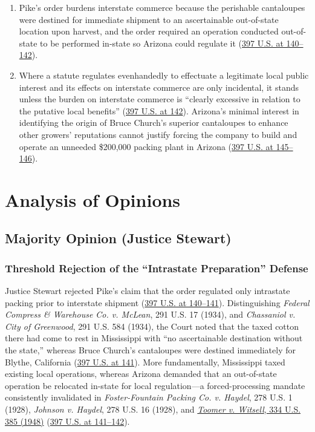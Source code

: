 \documentclass[12pt]{article}
\begin{document}
\begin{enumerate}
  \item Pike's order burdens interstate commerce because the perishable cantaloupes were destined for immediate shipment to an ascertainable out-of-state location upon harvest, and the order required an operation conducted out-of-state to be performed in-state so Arizona could regulate it (\href{https://supreme.justia.com/cases/federal/us/397/137/}{397 U.S. at 140--142}).
  \item Where a statute regulates evenhandedly to effectuate a legitimate local public interest and its effects on interstate commerce are only incidental, it stands unless the burden on interstate commerce is ``clearly excessive in relation to the putative local benefits'' (\href{https://supreme.justia.com/cases/federal/us/397/137/}{397 U.S. at 142}). Arizona's minimal interest in identifying the origin of Bruce Church's superior cantaloupes to enhance other growers' reputations cannot justify forcing the company to build and operate an unneeded \$200,000 packing plant in Arizona (\href{https://supreme.justia.com/cases/federal/us/397/137/}{397 U.S. at 145--146}).
\end{enumerate}

\section{Analysis of Opinions}
\subsection{Majority Opinion (Justice Stewart)}

\subsubsection{Threshold Rejection of the ``Intrastate Preparation'' Defense}

Justice Stewart rejected Pike's claim that the order regulated only intrastate packing prior to interstate shipment (\href{https://supreme.justia.com/cases/federal/us/397/137/}{397 U.S. at 140--141}). Distinguishing \textit{Federal Compress \& Warehouse Co. v. McLean}, 291 U.S. 17 (1934), and \textit{Chassaniol v. City of Greenwood}, 291 U.S. 584 (1934), the Court noted that the taxed cotton there had come to rest in Mississippi with ``no ascertainable destination without the state,'' whereas Bruce Church's cantaloupes were destined immediately for Blythe, California (\href{https://supreme.justia.com/cases/federal/us/397/137/}{397 U.S. at 141}). More fundamentally, Mississippi taxed existing local operations, whereas Arizona demanded that an out-of-state operation be relocated in-state for local regulation---a forced-processing mandate consistently invalidated in \textit{Foster-Fountain Packing Co. v. Haydel}, 278 U.S. 1 (1928), \textit{Johnson v. Haydel}, 278 U.S. 16 (1928), and \href{https://supreme.justia.com/cases/federal/us/334/385/}{\textit{Toomer v. Witsell}, 334 U.S. 385 (1948)} (\href{https://supreme.justia.com/cases/federal/us/397/137/}{397 U.S. at 141--142}).
\end{document}
